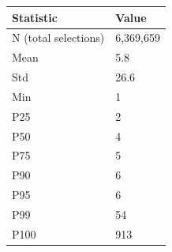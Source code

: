\begin{tabular}{ll}
\toprule
Statistic & Value \\
\midrule
N (total selections) & 6,369,659 \\
Mean & 5.8 \\
Std & 26.6 \\
Min & 1 \\
P25 & 2 \\
P50 & 4 \\
P75 & 5 \\
P90 & 6 \\
P95 & 6 \\
P99 & 54 \\
P100 & 913 \\
\bottomrule
\end{tabular}
